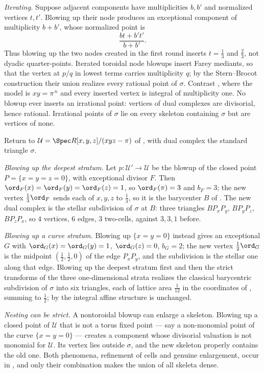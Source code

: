 \begin{example}
\emph{Iterating.} Suppose adjacent components have multiplicities
$b,b'$ and normalized vertices $t,t'$.  Blowing up their node produces
an exceptional component of multiplicity $b+b'$, whose normalized point is
\[
                 \frac{bt+b't'}{b+b'}.
\]
Thus blowing up the two nodes created in the first round inserts
$t=\tfrac13$ and $\tfrac23$, not dyadic quarter-points.  Iterated
toroidal node blowups insert Farey mediants, so that the vertex at $p/q$ in
lowest terms carries multiplicity $q$; by the Stern--Brocot construction
their union realizes every rational point of $\sigma$.  Contrast
, where the model is $xy=\pi^{\,n}$ and every
inserted vertex is integral of multiplicity one.  No blowup ever inserts an
irrational point: vertices of dual complexes are divisorial, hence rational.
Irrational points of $\sigma$ lie on every skeleton containing $\sigma$
but are vertices of none.
\end{example}

\begin{example}
\label{ex:refinement-triangle}
Return to $\mathcal U=\Spec R[x,y,z]/(xyz-\pi)$ of
, with dual complex the standard triangle
$\sigma$.

\emph{Blowing up the deepest stratum.} Let $p:\mathcal U'\to\mathcal U$ be
the blowup of the closed point $P=\{x=y=z=0\}$, with exceptional divisor
$F$. Then $\ord_F(x)=\ord_F(y)=\ord_F(z)=1$, so $\ord_F(\pi)=3$ and
$b_F=3$; the new vertex $\tfrac13\ord_F$ sends each of $x,y,z$ to
$\tfrac13$, so it is the barycenter $B$ of
. The new dual complex is the stellar
subdivision of $\sigma$ at $B$: three triangles $BP_xP_y$,
$BP_yP_z$, $BP_zP_x$, so $4$ vertices, $6$ edges, $3$ two-cells,
against $3,3,1$ before.

\emph{Blowing up a curve stratum.} Blowing up $\{x=y=0\}$ instead gives an
exceptional $G$ with $\ord_G(x)=\ord_G(y)=1$, $\ord_G(z)=0$,
$b_G=2$; the new vertex $\tfrac12\ord_G$ is the midpoint
$(\tfrac12,\tfrac12,0)$ of the edge $P_xP_y$, and the subdivision is the
stellar one along that edge. Blowing up the deepest stratum first and then
the strict transforms of the three one-dimensional strata realizes the
classical barycentric subdivision of $\sigma$
into six triangles, each of lattice area $\tfrac1{12}$ in the coordinates
of , summing to $\tfrac12$; by
 the integral affine structure is
unchanged.

\emph{Nesting can be strict.} A nontoroidal blowup can enlarge a skeleton.
Blowing up a
closed point of $\mathcal U$ that is not a torus fixed point --- say a
non-monomial point of the curve $\{x=y=0\}$ --- creates a component whose
divisorial valuation is not monomial for $\mathcal U$. Its vertex lies
outside $\sigma$, and the new skeleton properly contains the old one. Both
phenomena, refinement of cells and genuine enlargement, occur in
, and only their combination makes the
union of all skeleta dense.
\end{example}

